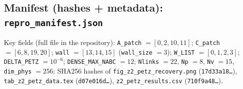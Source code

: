 \documentclass[11pt]{article}
\begin{document}
\subsection{Manifest (hashes + metadata): \texttt{repro\_manifest.json}}

Key fields (full file in the repository): \texttt{A\_patch} $= [0, 2,
10, 11]$; \texttt{C\_patch} $= [6, 8, 19, 20]$; \texttt{wall} $= [13,
14, 15]$ (\texttt{wall\_size} $= 3$); \texttt{W\_LIST} $= [0, 1, 2,
3]$; \texttt{DELTA\_PETZ} $= 10^{-6}$; \texttt{DENSE\_MAX\_NABC} $=
12$; \texttt{Nlinks} $= 22$, \texttt{Np} $= 8$, \texttt{Nv} $= 15$,
\texttt{dim\_phys} $= 256$; SHA256 hashes of
\texttt{fig\_z2\_petz\_recovery.png} (\texttt{17d33a18\ldots}),
\texttt{tab\_z2\_petz\_data.tex} (\texttt{d07e016d\ldots}),
\texttt{z2\_petz\_results.csv} (\texttt{710f9a48\ldots}).
\end{document}
